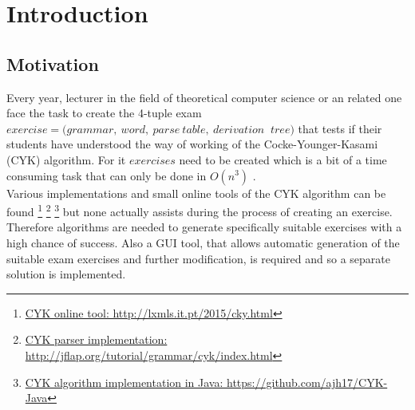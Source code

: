 
\section{Introduction}\label{Introduction}

\subsection{Motivation}
Every year, lecturer in the field of theoretical computer science or an related one face the task to create the 4-tuple exam $exercise = (grammar,\ word,\ parse\ table,\ derivation\ $ $tree)$ that tests if their students have understood the way of working of the Cocke-Younger-Kasami (CYK) algorithm. For it $exercises$ need to be created which is a bit of a time consuming task that can only be done in $O(n^3)$ \cite{YOUNGER.1967}. \\
Various implementations and small online tools of the CYK algorithm can be found \footnote{\href{http://lxmls.it.pt/2015/cky.html}{CYK online tool: http://lxmls.it.pt/2015/cky.html}} \footnote{\href{http://jflap.org/tutorial/grammar/cyk/index.html}{CYK parser implementation: http://jflap.org/tutorial/grammar/cyk/index.html}} \footnote{\href{https://github.com/ajh17/CYK-Java}{CYK algorithm implementation in Java: https://github.com/ajh17/CYK-Java}} but none actually assists during the process of creating an exercise.\\
Therefore algorithms are needed to generate specifically suitable exercises with a high chance of success. Also a GUI tool, that allows automatic generation of the suitable exam exercises and further modification, is required and so a separate solution is implemented.

